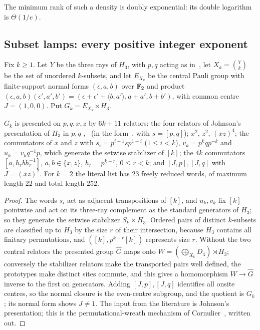 The minimum rank of such a density is doubly exponential: its double logarithm is $\Theta(1/e)$.

\subsection{Subset lamps: every positive integer exponent}\label{sec:exact-subset}

Fix $k\ge1$. Let $Y$ be the three rays of $H_3$, with $p,q$ acting as in~\cite[Definition~6.1]{DM-game}, let $X_k=\binom Yk$ be the set of
unordered $k$-subsets, and let $E_{X_k}$ be the central Pauli group with finite-support normal forms $(\epsilon,a,b)$ over $\mathbb F_2$ and
product $(\epsilon,a,b)(\epsilon',a',b')=(\epsilon+\epsilon'+\langle b,a'\rangle,a+a',b+b')$, with common centre $J=(1,0,0)$. Put
$G_k=E_{X_k}\rtimes H_3$.

\begin{proposition}[Presentation]\label{prop:subset-presentation}
$G_k$ is presented on $p,q,x,z$ by $6k+11$ relators: the four relators of Johnson's presentation of $H_3$ in $p,q$
\cite{Joh99},~\cite[Theorem~2.8]{Lee12} (in the form~\cite[(6)]{DM-game}, with $s=[p,q]$); $x^2$, $z^2$, $(xz)^4$; the commutators of $x$
and $z$ with $s_i=p^{i-1}sp^{1-i}$ ($1\le i<k$), $v_k=p^kqp^{-k}$ and $u_k=v_kq^{-1}p$, which generate the setwise stabilizer of $[k]$;
the $4k$ commutators $[a,h_rbh_r^{-1}]$, $a,b\in\{x,z\}$, $h_r=p^{k-r}$, $0\le r<k$; and $[J,p],[J,q]$ with $J=(xz)^2$. For $k=2$ the
literal list has $23$ freely reduced words, of maximum length $22$ and total length $252$.
\end{proposition}

\begin{proof}
The words $s_i$ act as adjacent transpositions of $[k]$, and $u_k,v_k$ fix $[k]$ pointwise and act on its three-ray complement as
the standard generators of $H_3$; so they generate the setwise stabilizer $S_k\times H_3$. Ordered pairs of distinct $k$-subsets are
classified up to $H_3$ by the size $r$ of their intersection, because $H_3$ contains all finitary permutations, and
$([k],p^{k-r}[k])$ represents size $r$. Without the two central relators the presented group $\hat G$ maps onto
$W=(\bigoplus_{X_k}D_4)\rtimes H_3$; conversely the stabilizer relators make the transported pairs well defined, the prototypes make
distinct sites commute, and this gives a homomorphism $W\to\hat G$ inverse to the first on generators. Adding $[J,p],[J,q]$
identifies all onsite centres, so the normal closure is the even-centre subgroup, and the quotient is $G_k$; its normal form
shows $J\ne1$. The input from the literature is Johnson's presentation; this is the permutational-wreath mechanism of
Cornulier~\cite{Cor06}, written out.
\end{proof}

